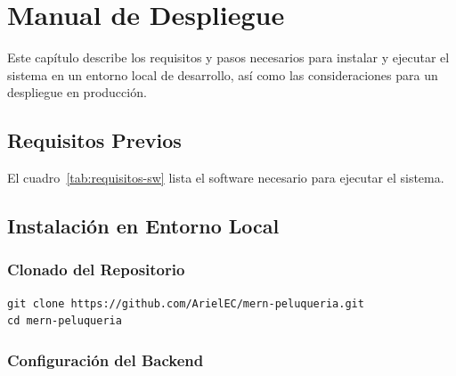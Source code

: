 
\chapter{Manual de Despliegue}\label{cap:manual-despliegue}

Este cap\'itulo describe los requisitos y pasos necesarios para instalar y ejecutar el sistema en un entorno local de desarrollo, as\'i como las consideraciones para un despliegue en producci\'on.

\section{Requisitos Previos}\label{sec:requisitos-previos}

El cuadro~\ref{tab:requisitos-sw} lista el software necesario para ejecutar el sistema.


\section{Instalaci\'on en Entorno Local}\label{sec:instalacion-local}

\subsection{Clonado del Repositorio}\label{subsec:clonado}

\begin{verbatim}
git clone https://github.com/ArielEC/mern-peluqueria.git
cd mern-peluqueria
\end{verbatim}

\subsection{Configuraci\'on del Backend}\label{subsec:config-backend}


